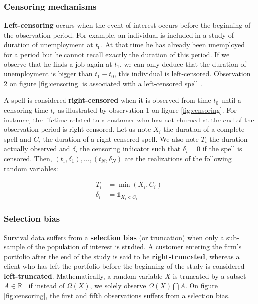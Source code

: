 \documentclass[
]{book}
\begin{document}
\hypertarget{censoring-mechanisms}{%
\subsubsection*{Censoring mechanisms}\label{censoring-mechanisms}}

\textbf{Left-censoring} occurs when the event of interest occurs before the beginning of the observation period. For example, an individual is included in a study of duration of unemployment at \(t_0\). At that time he has already been unemployed for a period but he cannot recall exactly the duration of this period. If we observe that he finds a job again at \(t_1\), we can only deduce that the duration of unemployment is bigger than \(t_1-t_0\), this individual is left-censored. Observation 2 on figure \ref{fig:censoring} is associated with a left-censored spell \citep{LIU_SCOR}.

A spell is considered \textbf{right-censored} when it is observed from time \(t_0\) until a censoring time \(t_c\) as illustrated by observation 1 on figure \ref{fig:censoring}. For instance, the lifetime related to a customer who has not churned at the end of the observation period is right-censored. Let us note \(X_i\) the duration of a complete spell and \(C_i\) the duration of a right-censored spell. We also note \(T_i\) the duration actually observed and \(\delta_i\) the censoring indicator such that \(\delta_i = 0\) if the spell is censored. Then, \((t_1, \delta_1),\dots,(t_N, \delta_N)\) are the realizations of the following random variables:

\begin{equation}
  \begin{aligned}
  T_i & = \min(X_i, C_i) \\
  \delta_i & = \mathbb{1}_{X_i < C_i}
  \end{aligned}
  \label{eq:censoring}
\end{equation}

\hypertarget{selection-bias}{%
\subsubsection*{Selection bias}\label{selection-bias}}

Survival data suffers from a \textbf{selection bias} (or truncation) when only a sub-sample of the population of interest is studied. A customer entering the firm's portfolio after the end of the study is said to be \textbf{right-truncated}, whereas a client who has left the portfolio before the beginning of the study is considered \textbf{left-truncated}. Mathematically, a random variable \(X\) is truncated by a subset \(A \in \mathbb{R}^+\) if instead of \(\Omega(X)\), we solely observe \(\Omega(X)\bigcap A\). On figure \ref{fig:censoring}, the first and fifth observations suffers from a selection bias.
\end{document}
